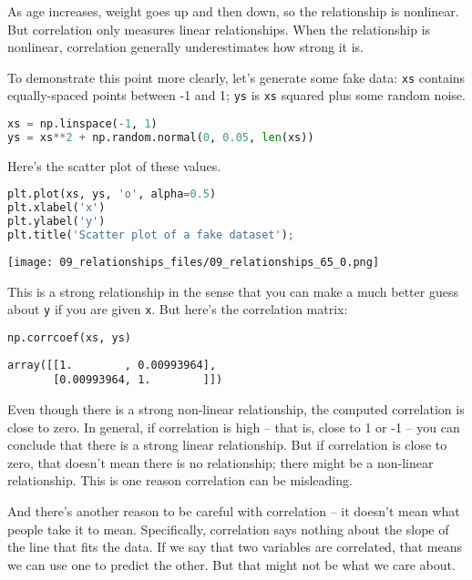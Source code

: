 As age increases, weight goes up and then down, so the relationship is
nonlinear. But correlation only measures linear relationships. When the
relationship is nonlinear, correlation generally underestimates how
strong it is.

To demonstrate this point more clearly, let's generate some fake data:
\passthrough{\lstinline!xs!} contains equally-spaced points between -1
and 1; \passthrough{\lstinline!ys!} is \passthrough{\lstinline!xs!}
squared plus some random noise.

\begin{lstlisting}[language=Python,style=source]
xs = np.linspace(-1, 1)
ys = xs**2 + np.random.normal(0, 0.05, len(xs))
\end{lstlisting}

\pagebreak

Here's the scatter plot of these values.

\begin{lstlisting}[language=Python,style=source]
plt.plot(xs, ys, 'o', alpha=0.5)
plt.xlabel('x')
plt.ylabel('y')
plt.title('Scatter plot of a fake dataset');
\end{lstlisting}

\begin{center}
\texttt{[image: 09\_relationships\_files/09\_relationships\_65\_0.png]}
\end{center}

This is a strong relationship in the sense that you can make a much
better guess about \passthrough{\lstinline!y!} if you are given
\passthrough{\lstinline!x!}. But here's the correlation matrix:

\begin{lstlisting}[language=Python,style=source]
np.corrcoef(xs, ys)
\end{lstlisting}

\begin{lstlisting}[style=output]
array([[1.        , 0.00993964],
       [0.00993964, 1.        ]])
\end{lstlisting}

Even though there is a strong non-linear relationship, the computed
correlation is close to zero. In general, if correlation is high -- that
is, close to 1 or -1 -- you can conclude that there is a strong linear
relationship. But if correlation is close to zero, that doesn't mean
there is no relationship; there might be a non-linear relationship. This
is one reason correlation can be misleading.

And there's another reason to be careful with correlation -- it doesn't
mean what people take it to mean. Specifically, correlation says nothing
about the slope of the line that fits the data. If we say that two
variables are correlated, that means we can use one to predict the
other. But that might not be what we care about.

